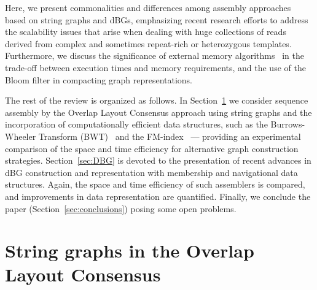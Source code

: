 \documentclass[11pt,oneside,a4paper]{article}
\begin{document}
Here, we present commonalities and differences among assembly approaches based
on string graphs and dBGs, emphasizing recent research efforts to address the
scalability issues that arise when dealing with huge collections of reads derived
from complex and sometimes repeat-rich or heterozygous templates.
%
%
Furthermore, we discuss the significance of external memory
algorithms~\cite{DBLP:conf/wabi/BonizzoniVPPR14} in the trade-off between
execution times and memory requirements, and the use of the Bloom filter in
compacting graph representations.

The rest of the review is organized as follows.
%
In Section~\ref{sec:string-graph} we consider sequence assembly by the Overlap
Layout Consensus approach using string graphs and the incorporation of
computationally efficient data structures, such as the Burrows-Wheeler Transform
(BWT)~\cite{Burrows1994} and the FM-index~\cite{Ferragina2005}  --- providing
an experimental comparison of the space and time efficiency for alternative
graph construction strategies.
%
Section~\ref{sec:DBG} is devoted to the presentation of recent advances in dBG
construction and representation with membership and navigational data structures.
%
Again, the space and time efficiency of such assemblers is compared, and improvements in data representation are quantified.
%
Finally, we conclude the paper (Section~\ref{sec:conclusions}) posing some open problems.

\section{String graphs in the Overlap Layout Consensus}
\label{sec:string-graph}
\end{document}
